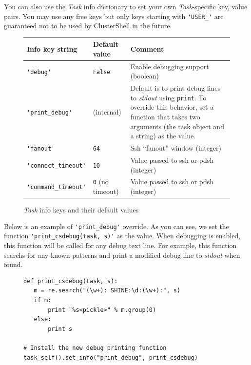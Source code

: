 \documentclass[english,a4paper]{csuserguide}
\newcommand{\Task}{\textit{Task}\xspace}
\begin{document}
You can also use the \Task info dictionary to set your own \Task-specific key, value pairs. You may use any free keys but only keys starting with \lstinline+'USER_'+ are guaranteed not to be used by ClusterShell in the future.

\begin{figure}[!h]
\begin{center}
\begin{tabular}{|p{3.8cm}|p{2.9cm}|p{9.8cm}|} 
\hline 
\textbf{Info key string} & \textbf{Default value} & \textbf{Comment} \\
\hline
\lstinline+'debug'+ & \lstinline+False+ & Enable debugging support (boolean) \\
\hline
\lstinline+'print_debug'+ & (internal) & Default is to print debug lines to \emph{stdout} using \verb+print+. To override this behavior, set a function that takes two arguments (the task object and a string) as the value.\\
\hline
\lstinline+'fanout'+ & \lstinline+64+ & Ssh ``fanout'' window (integer) \\
\hline
\lstinline+'connect_timeout'+ & \lstinline+10+ & Value passed to ssh or pdsh (integer) \\
\hline
\lstinline+'command_timeout'+ & \lstinline+0+ (no timeout) & Value passed to ssh or pdsh (integer) \\
\hline
\end{tabular}
\end{center}
\caption{\Task info keys and their default values}
\end{figure}

\bigskip

Below is an example of \lstinline+'print_debug'+ override. As you can see, we set the function \lstinline+'print_csdebug(task, s)'+ as the value. When debugging is enabled, this function will be called for any debug text line. For example, this function searchs for any known patterns and print a modified debug line to \emph{stdout} when found.
\begin{figure}[!h]
\begin{center}
\begin{lstlisting}[breaklines=true, breakatwhitespace=true]
def print_csdebug(task, s):
   m = re.search("(\w+): SHINE:\d:(\w+):", s)
   if m:
       print "%s<pickle>" % m.group(0)
   else:
       print s

# Install the new debug printing function
task_self().set_info("print_debug", print_csdebug)
\end{lstlisting}
\end{center}
\end{figure}
\end{document}
